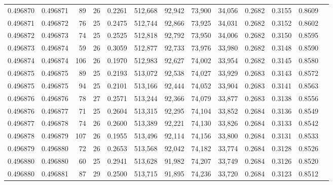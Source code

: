 \begin{tabular}{rrrrrrrrrrrrr}
0.496870 & 0.496871 &  89 &  26 &                                     0.2261 & 512,668 &  92,942 &  73,900 &  34,056 & 0.2682 & 0.3155 & 0.8609 \\
0.496871 & 0.496872 &  76 &  25 &                                     0.2475 & 512,744 &  92,866 &  73,925 &  34,031 & 0.2682 & 0.3152 & 0.8602 \\
0.496872 & 0.496873 &  74 &  25 &                                     0.2525 & 512,818 &  92,792 &  73,950 &  34,006 & 0.2682 & 0.3150 & 0.8595 \\
0.496873 & 0.496874 &  59 &  26 &                                     0.3059 & 512,877 &  92,733 &  73,976 &  33,980 & 0.2682 & 0.3148 & 0.8590 \\
0.496874 & 0.496874 & 106 &  26 &                                     0.1970 & 512,983 &  92,627 &  74,002 &  33,954 & 0.2682 & 0.3145 & 0.8580 \\
0.496875 & 0.496875 &  89 &  25 &                                     0.2193 & 513,072 &  92,538 &  74,027 &  33,929 & 0.2683 & 0.3143 & 0.8572 \\
0.496875 & 0.496875 &  94 &  25 &                                     0.2101 & 513,166 &  92,444 &  74,052 &  33,904 & 0.2683 & 0.3141 & 0.8563 \\
0.496876 & 0.496876 &  78 &  27 &                                     0.2571 & 513,244 &  92,366 &  74,079 &  33,877 & 0.2683 & 0.3138 & 0.8556 \\
0.496876 & 0.496877 &  71 &  25 &                                     0.2604 & 513,315 &  92,295 &  74,104 &  33,852 & 0.2684 & 0.3136 & 0.8549 \\
0.496877 & 0.496878 &  74 &  26 &                                     0.2600 & 513,389 &  92,221 &  74,130 &  33,826 & 0.2684 & 0.3133 & 0.8542 \\
0.496878 & 0.496879 & 107 &  26 &                                     0.1955 & 513,496 &  92,114 &  74,156 &  33,800 & 0.2684 & 0.3131 & 0.8533 \\
0.496879 & 0.496880 &  72 &  26 &                                     0.2653 & 513,568 &  92,042 &  74,182 &  33,774 & 0.2684 & 0.3128 & 0.8526 \\
0.496880 & 0.496880 &  60 &  25 &                                     0.2941 & 513,628 &  91,982 &  74,207 &  33,749 & 0.2684 & 0.3126 & 0.8520 \\
0.496880 & 0.496881 &  87 &  29 &                                     0.2500 & 513,715 &  91,895 &  74,236 &  33,720 & 0.2684 & 0.3123 & 0.8512 \\

\end{tabular}
